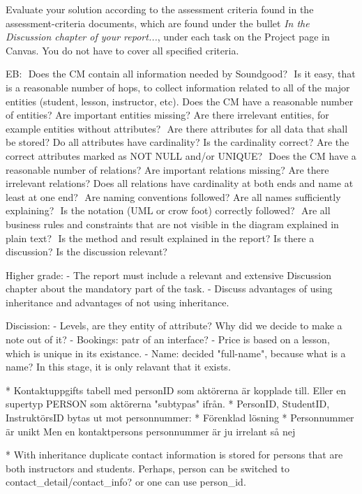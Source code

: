 \documentclass[a4paper]{scrartcl}
\begin{document}
Evaluate your solution according to the assessment criteria found in the assessment-criteria documents, which are found under the bullet \textit{In the Discussion chapter of your report...}, under each task on the Project page in Canvas. You do not have to cover all specified criteria.

EB:
 Does the CM contain all information needed by Soundgood?
 Is it easy, that is a reasonable number of hops, to collect information related to all of the major entities (student, lesson, instructor, etc).
 Does the CM have a reasonable number of entities? Are important entities missing? Are there irrelevant entities, for example entities without attributes?
 Are there attributes for all data that shall be stored? Do all attributes have cardinality? Is the cardinality correct? Are the correct attributes marked as NOT NULL and/or UNIQUE?
 Does the CM have a reasonable number of relations? Are important relations missing? Are there irrelevant relations? Does all relations have cardinality at both ends and name at least at one end?
 Are naming conventions followed? Are all names sufficiently explaining?
 Is the notation (UML or crow foot) correctly followed?
 Are all business rules and constraints that are not visible in the diagram explained in plain text?
 Is the method and result explained in the report? Is there a discussion? Is the discussion relevant?

Higher grade:
- The report must include a relevant and extensive Discussion chapter about the mandatory part of the task.
- Discuss advantages of using inheritance and advantages of not using inheritance. 


Discission: 
- Levels, are they entity of attribute? Why did we decide to make a note out of it? 
- Bookings: patr of an interface? 
- Price is based on a lesson, which is unique in its existance.
- Name: decided "full-name", because what is a name? In this stage, it is only relavant that it exists. 

* Kontaktuppgifts tabell med personID som aktörerna är kopplade till. Eller en
  supertyp PERSON som aktörerna "subtypas" ifrån. 
* PersonID, StudentID, InstruktörsID bytas ut mot personnummer:
    * Förenklad lösning
    * Personnummer är unikt
  Men en kontaktpersons personnummer är ju irrelant så nej

* With inheritance duplicate contact information is stored for persons that are both instructors and students. Perhaps, person can be switched to contact_detail/contact_info?
or one can use person_id. 
\end{document}
